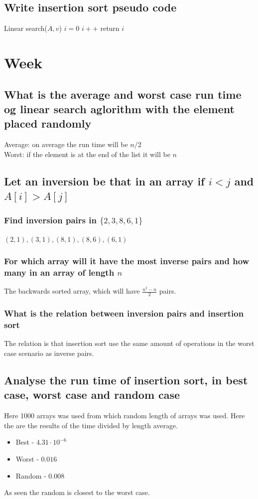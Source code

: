 \documentclass[12pt, a4paper]{article}
\begin{document}
			\subsection{Write insertion sort pseudo code}
				\begin{algorithmic}[1]
					\State Linear search($A,v$)
					\State $i=0$
						\State $i++$
					\EndWhile
					\State return $i$
				\end{algorithmic}
		\section{Week}
			\subsection{What is the average and worst case run time og linear search aglorithm with the element placed randomly}
				Average: on average the run time will be $n/2$ \\
				Worst: if the element is at the end of the list it will be $n$
			\subsection{Let an inversion be that in an array if $i<j$ and $A[i]>A[j]$}
				\subsubsection{Find inversion pairs in $\{2,3,8,6,1\}$}
					$(2,1),(3,1),(8,1),(8,6),(6,1)$
				\subsubsection{For which array will it have the most inverse pairs and how many in an array of length $n$}
					The backwards sorted array, which will have $\frac{n^2-n}{2}$ pairs.
				\subsubsection{What is the relation between inversion pairs and insertion sort}
					The relation is that insertion sort use the same amount of operations in the worst case scenario as inverse pairs.
			\subsection{Analyse the run time of insertion sort, in best case, worst case and random case}
				Here 1000 arrays was used from which random length of arrays was used. Here the are the results of the time divided by length average.\\
				\begin{itemize}
					\item Best - $4.31\cdot 10^{-6}$
					\item Worst - $0.016$
					\item Random - $0.008$
				\end{itemize}
				As seen the random is closest to the worst case. 
\end{document}
